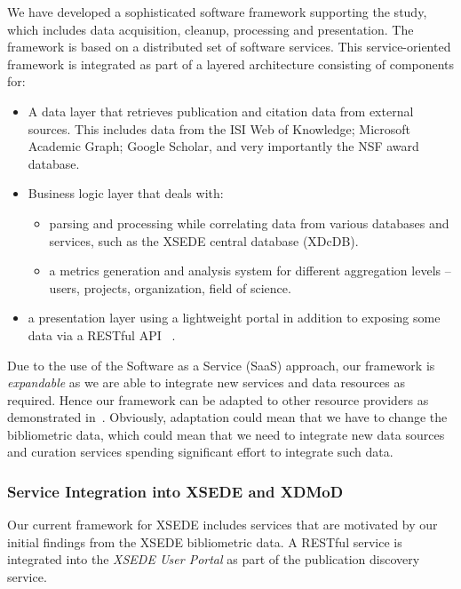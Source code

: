 \documentclass{sig-alternate}
\begin{document}
We have developed a sophisticated software framework supporting the
study, which includes data acquisition, cleanup, processing and
presentation. The framework is based on a distributed set of software
services. This service-oriented framework is integrated as part of a
layered architecture consisting of components for:

\begin{itemize}
\item A data layer that retrieves publication and citation data from
  external sources.  This includes data from the ISI Web of Knowledge;
  Microsoft Academic Graph; Google Scholar, and very importantly the
  NSF award database.

\item Business logic layer that deals with:

  \begin{itemize}
  \item parsing and processing while correlating data from various
    databases and services, such as the XSEDE central database
    (XDcDB).
  \item a metrics generation and analysis system for different
    aggregation levels -- users, projects, organization, field of
    science.
  \end{itemize}

\item a presentation layer using a lightweight portal in addition to
  exposing some data via a RESTful API
  ~\cite{Wang:2014:TSI:2616498.2616507}.
\end{itemize}

Due to the use of the Software as a Service (SaaS) approach, our
framework is \emph{expandable} as we are able to integrate new
services and data resources as required. Hence our framework can be
adapted to other resource providers as demonstrated
in~\cite{tas2015}. Obviously, adaptation could mean that we have to
change the bibliometric data, which could mean that we need to
integrate new data sources and curation services spending significant
effort to integrate such data.

\subsubsection{Service Integration into XSEDE and XDMoD}

Our current framework for XSEDE includes services that are motivated
by our initial findings from the XSEDE bibliometric data. A RESTful
service is integrated into the \emph{XSEDE User Portal} as part of the
publication discovery service.
\end{document}
